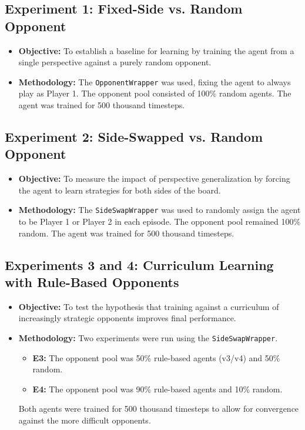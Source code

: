 \documentclass[conference]{IEEEtran}
\begin{document}
\subsection{Experiment 1: Fixed-Side vs. Random Opponent}
\begin{itemize}
    \item \textbf{Objective:} To establish a baseline for learning by training the agent from a single perspective against a purely random opponent.
    \item \textbf{Methodology:} The \texttt{OpponentWrapper} was used, fixing the agent to always play as Player 1. The opponent pool consisted of 100\% random agents. The agent was trained for 500 thousand timesteps.
\end{itemize}

\subsection{Experiment 2: Side-Swapped vs. Random Opponent}
\begin{itemize}
    \item \textbf{Objective:} To measure the impact of perspective generalization by forcing the agent to learn strategies for both sides of the board.
    \item \textbf{Methodology:} The \texttt{SideSwapWrapper} was used to randomly assign the agent to be Player 1 or Player 2 in each episode. The opponent pool remained 100\% random. The agent was trained for 500 thousand timesteps.
\end{itemize}

\subsection{Experiments 3 and 4: Curriculum Learning with Rule-Based Opponents}
\begin{itemize}
    \item \textbf{Objective:} To test the hypothesis that training against a curriculum of increasingly strategic opponents improves final performance.
    \item \textbf{Methodology:} Two experiments were run using the \texttt{SideSwapWrapper}.
        \begin{itemize}
            \item \textbf{E3:} The opponent pool was 50\% rule-based agents (v3/v4) and 50\% random.
            \item \textbf{E4:} The opponent pool was 90\% rule-based agents and 10\% random.
        \end{itemize}
    Both agents were trained for 500 thousand timesteps to allow for convergence against the more difficult opponents.
\end{itemize}
\end{document}

